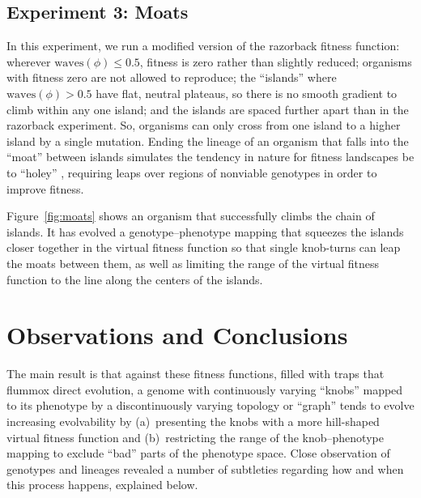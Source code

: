 \documentclass[letterpaper]{article}
\begin{document}
\subsection{Experiment 3: Moats}

In this experiment, we run a modified version of the razorback fitness
function: wherever $\text{waves}(\phi) \leq 0.5$, fitness is zero rather than
slightly reduced; organisms with fitness zero are not allowed to
reproduce; the ``islands'' where $\text{waves}(\phi) > 0.5$ have flat, neutral
plateaus, so there is no smooth gradient to climb within any one island; and
the islands are spaced further apart than in the razorback experiment. So,
organisms can only cross from one island to a higher island by a single
mutation. Ending the lineage of an organism that falls into the ``moat''
between islands simulates the tendency in nature for fitness landscapes be to
``holey'' \citep{gavrilets1997evolution}, requiring leaps over regions of
nonviable genotypes in order to improve fitness.

Figure~\ref{fig:moats} shows an organism that successfully climbs the chain of
islands.  It has evolved a genotype--phenotype mapping that squeezes the
islands closer together in the virtual fitness function so that single
knob-turns can leap the moats between them, as well as limiting the range of
the virtual fitness function to the line along the centers of the islands.

\section{Observations and Conclusions}

The main result is that against these fitness functions, filled with traps
that flummox direct evolution, a genome with continuously varying ``knobs''
mapped to its phenotype by a discontinuously varying topology or ``graph''
tends to evolve increasing evolvability by (a)~presenting the knobs with a
more hill-shaped virtual fitness function and (b)~restricting the range of the
knob--phenotype mapping to exclude ``bad'' parts of the phenotype space.
Close observation of genotypes and lineages revealed a number of subtleties
regarding how and when this process happens, explained below.

\end{document}
